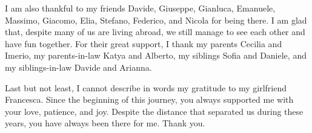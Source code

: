 I am also thankful to my friends Davide, Giuseppe, Gianluca, Emanuele, Massimo,
Giacomo, Elia, Stefano, Federico, and Nicola for being there. I am glad that,
despite many of us are living abroad, we still manage to see each other and
have fun together.
%
For their great support, I thank my parents Cecilia and Imerio, my
parents-in-law Katya and Alberto, my siblings Sofia and Daniele, and my
siblings-in-law Davide and Arianna.

Last but not least, I cannot describe in words my gratitude to my girlfriend Francesca.
Since the beginning of this journey, you always supported me with your love,
patience, and joy.
Despite the distance that separated us during these years, you have always been there for me.
Thank you.
